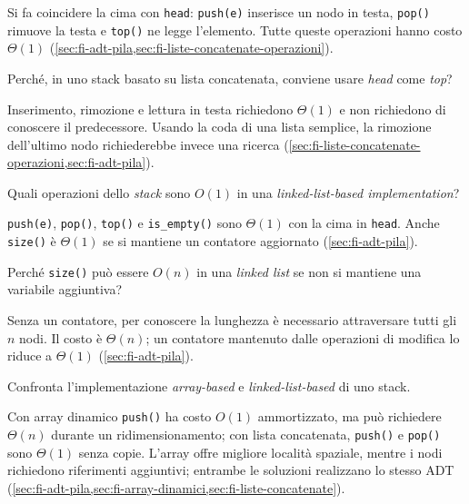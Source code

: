 Si fa coincidere la cima con \texttt{head}: \texttt{push(e)} inserisce un nodo
in testa, \texttt{pop()} rimuove la testa e \texttt{top()} ne legge l'elemento.
Tutte queste operazioni hanno costo \(\Theta(1)\)
(\cref{sec:fi-adt-pila,sec:fi-liste-concatenate-operazioni}).

\begin{exercise}
\label{ex:fi-esercizi-strutture-dati-stack-head-come-top}
Perché, in uno stack basato su lista concatenata, conviene usare
\emph{head} come \emph{top}?
\end{exercise}

Inserimento, rimozione e lettura in testa richiedono \(\Theta(1)\) e non
richiedono di conoscere il predecessore. Usando la coda di una lista semplice,
la rimozione dell'ultimo nodo richiederebbe invece una ricerca
(\cref{sec:fi-liste-concatenate-operazioni,sec:fi-adt-pila}).

\begin{exercise}
\label{ex:fi-esercizi-strutture-dati-stack-linked-costi}
Quali operazioni dello \emph{stack} sono \(O(1)\) in una \emph{linked-list-based
implementation}?
\end{exercise}

\texttt{push(e)}, \texttt{pop()}, \texttt{top()} e \texttt{is\_empty()} sono
\(\Theta(1)\) con la cima in \texttt{head}. Anche \texttt{size()} è
\(\Theta(1)\) se si mantiene un contatore aggiornato (\cref{sec:fi-adt-pila}).

\begin{exercise}
\label{ex:fi-esercizi-strutture-dati-stack-size-lineare}
Perché \texttt{size()} può essere \(O(n)\) in una \emph{linked list} se non si
mantiene una variabile aggiuntiva?
\end{exercise}

Senza un contatore, per conoscere la lunghezza è necessario attraversare tutti
gli \(n\) nodi. Il costo è \(\Theta(n)\); un contatore mantenuto dalle
operazioni di modifica lo riduce a \(\Theta(1)\) (\cref{sec:fi-adt-pila}).

\begin{exercise}
\label{ex:fi-esercizi-strutture-dati-stack-array-vs-linked}
Confronta l'implementazione \emph{array-based} e \emph{linked-list-based} di uno
stack.
\end{exercise}

Con array dinamico \texttt{push()} ha costo \(O(1)\) ammortizzato, ma può
richiedere \(\Theta(n)\) durante un ridimensionamento; con lista concatenata,
\texttt{push()} e \texttt{pop()} sono \(\Theta(1)\) senza copie. L'array offre
migliore località spaziale, mentre i nodi richiedono riferimenti aggiuntivi;
entrambe le soluzioni realizzano lo stesso ADT
(\cref{sec:fi-adt-pila,sec:fi-array-dinamici,sec:fi-liste-concatenate}).

